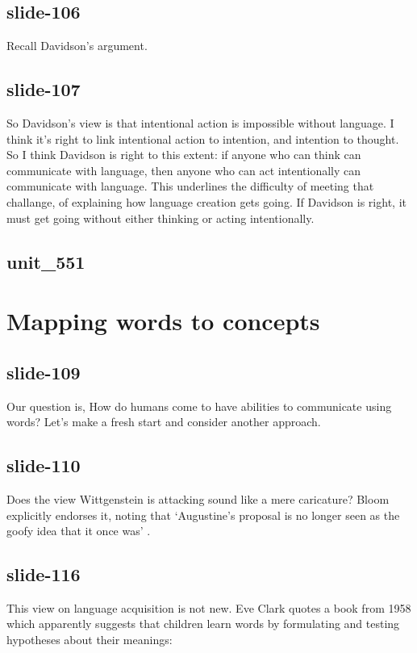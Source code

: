 \documentclass[12pt,\papersize]{extarticle}
\begin{document}
 
\subsection{slide-106}
Recall Davidson's argument.
 
 
\subsection{slide-107}
So Davidson's view is that intentional action is impossible without language.
I think it's right to link intentional action to intention, and intention to thought.
So I think Davidson is right to this extent: if anyone who can think can communicate with language, then anyone who can act intentionally can communicate with language.
This underlines the difficulty of meeting that challange, of explaining how language creation gets going.
If Davidson is right, it must get going without either thinking or acting intentionally.
 
 
\subsection{unit\_551}
 
\section{Mapping words to concepts}
 
 
\subsection{slide-109}
Our question is, How do humans come to have abilities to communicate using words?
Let's make a fresh start and consider another approach.
 
 
\subsection{slide-110}
Does the view Wittgenstein is attacking sound like a mere caricature? Bloom explicitly endorses it, noting that ‘Augustine’s proposal is no longer seen as the goofy idea that it once was’ \citep[p.\ 61]{Bloom:2000qz}.
 
 
\subsection{slide-116}
This view on language acquisition is not new.
Eve Clark quotes a book from 1958 which apparently suggests that children learn words by formulating and testing hypotheses about their meanings:
 
\end{document}
